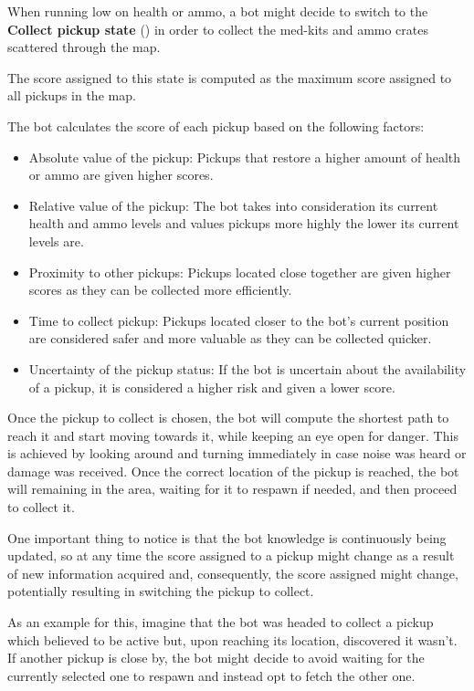 When running low on health or ammo, a bot might decide to switch to the \textbf{Collect pickup state} () in order to collect the med-kits and ammo crates scattered through the map.

The score assigned to this state is computed as the maximum score assigned to all pickups in the map.

The bot calculates the score of each pickup based on the following factors:

\begin{itemize}
\item Absolute value of the pickup: Pickups that restore a higher amount of health or ammo are given higher scores.
\item Relative value of the pickup: The bot takes into consideration its current health and ammo levels and values pickups more highly the lower its current levels are.
\item Proximity to other pickups: Pickups located close together are given higher scores as they can be collected more efficiently.
\item Time to collect pickup: Pickups located closer to the bot's current position are considered safer and more valuable as they can be collected quicker.
\item Uncertainty of the pickup status: If the bot is uncertain about the availability of a pickup, it is considered a higher risk and given a lower score.
\end{itemize}

Once the pickup to collect is chosen, the bot will compute the shortest path to reach it and start moving towards it, while keeping an eye open for danger. This is achieved by looking around and turning immediately in case noise was heard or damage was received.
Once the correct location of the pickup is reached, the bot will remaining in the area, waiting for it to respawn if needed, and then proceed to collect it.

One important thing to notice is that the bot knowledge is continuously being updated, so at any time the score assigned to a pickup might change as a result of new information acquired and, consequently, the score assigned might change, potentially resulting in switching the pickup to collect.

As an example for this, imagine that the bot was headed to collect a pickup which believed to be active but, upon reaching its location, discovered it wasn’t. If another pickup is close by, the bot might decide to avoid waiting for the currently selected one to respawn and instead opt to fetch the other one.

